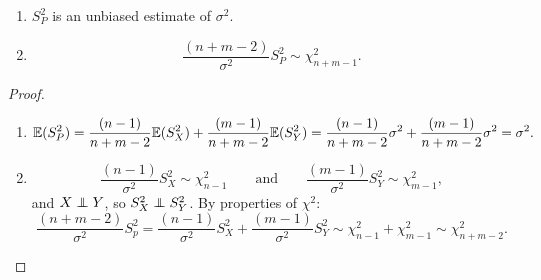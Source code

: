 \documentclass[10pt, a4paper]{article}
\begin{document}
\begin{proposition}\phantom{}
    \begin{enumerate}[label = (\roman*)]
        \item $S_{P} ^ 2$ is an unbiased estimate of $\sigma ^ 2$.

        \item
        \[
        \frac{(n + m - 2)}{\sigma ^ 2}S_{P} ^ 2 \sim \chi_{n + m - 1}^{2}.
        \]
    \end{enumerate}

    \begin{proof}\phantom{}
        \begin{enumerate}[label = (\roman*)]
            \item
            \[
            \mathbb{E}(S_{P} ^ 2) = \frac{(n - 1)}{n + m - 2}\mathbb{E}(S_{X} ^ 2) + \frac{(m - 1)}{n + m - 2}\mathbb{E}(S_{Y} ^ 2) = \frac{(n - 1)}{n + m - 2}\sigma ^ 2 + \frac{(m - 1)}{n + m - 2}\sigma ^ 2 = \sigma ^ 2.
            \]

            \item
            \[
            \frac{(n - 1)}{\sigma ^ 2}S_{X} ^ 2 \sim \chi_{n - 1}^{2}\qquad\text{and}\qquad \frac{(m - 1)}{\sigma ^ 2}S_{Y} ^ 2 \sim \chi_{m - 1}^{2},
            \]
            and $X \independent Y$,
            so $S_{X} ^ 2 \independent S_{Y} ^ 2$.
            By properties of $\chi ^ 2$:
            \[
            \frac{(n + m - 2)}{\sigma ^ 2}S_{p}^2 = \frac{(n - 1)}{\sigma ^ 2}S_{X} ^ 2 + \frac{(m - 1)}{\sigma ^ 2}S_{Y} ^ 2 \sim \chi_{n - 1}^{2} + \chi_{m - 1}^{2} \sim \chi_{n + m - 2}^{2}.
            \]
        \end{enumerate}
    \end{proof}
\end{proposition}
\end{document}
